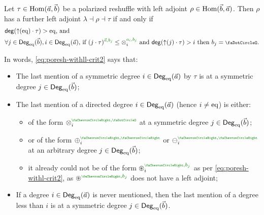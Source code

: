 \documentclass[a4paper]{memoir}
\begin{document}
\begin{theorem} \label{thm:poresh-withll}
	Let $\tau \in {\mathrm{Hom}}(\vec a, \vec b)$ be a polarized reshuffle with left adjoint $\rho \in {\mathrm{Hom}}(\vec b, \vec a)$.
	Then $\rho$ has a further left adjoint $\lambda \dashv \rho \dashv \tau$ if and only if
	\begin{align}
		&\text{$\getdeg(\sucdeg(\eqtydeg) \cdot \tau) > \eqtydeg$, and} \label{eq:poresh-withll-crit1} \\
		&\text{$\forall j \in \Degeq(\vec b), i \in \Degeq(\vec a)$, if $(j \cdot \tau)\pmrhom{\vec a}{b_j} \leq \mixpol_i\pmrhom{a_i}{b_j}$ and $\getdeg(\sucdeg(j) \cdot \tau) > i$ then $b_j = \npolar$.} \label{eq:poresh-withll-crit2}
	\end{align}
\end{theorem}
In words, \cref{eq:poresh-withll-crit2} says that:
\begin{itemize}
	\item The last mention of a symmetric degree $i \in {\mathsf{Deg}_{\mathrm{eq}}}(\vec a)$ by $\tau$ is at a symmetric degree $j \in {\mathsf{Deg}_{\mathrm{eq}}}(\vec b)$;
	\item The last mention of a directed degree $i \in {\mathsf{Deg}_{\mathrm{eq}}}(\vec a)$ (hence $i \neq {\mathrm{eq}}$) is either:
	\begin{itemize}
		\item of the form $\mixpol_i\pmryn$ at a symmetric degree $j \in {\mathsf{Deg}_{\mathrm{eq}}}(\vec b)$;
		\item or of the form $\pospol_i\pmryy$ or $\negpol_i\pmryy$ at an arbitrary degree $j \in {\mathsf{Deg}_{\mathrm{eq}}}(\vec b)$;
		\item it already could not be of the form $\isopol_i\pmrhom{\ypolar}{b_j}$ as per \cref{eq:poresh-withl-crit2}, as $\isopol\pmrhom{\ypolar}{b_j}$ does not have a left adjoint;
	\end{itemize}
	\item If a degree $i \in {\mathsf{Deg}_{\mathrm{eq}}}(\vec a)$ is never mentioned, then the last mention of a degree less than $i$ is at a symmetric degree $j \in {\mathsf{Deg}_{\mathrm{eq}}}(\vec b)$.
\end{itemize}
\end{document}
